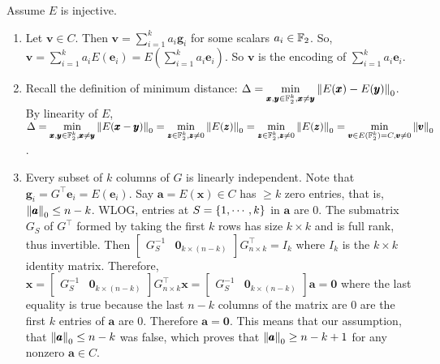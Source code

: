 \soln
Assume $E$ is injective.
\begin{enumerate}[leftmargin=*, label=(\alph*)]
\item Let $\pmb v\in C$. Then $\pmb v= \sum\limits_{i=1}^{k}a_{i}\pmb g_{i}$ for some scalars $a_{i}\in\mathbb{F}_{2}$. So, $\pmb v = \sum\limits_{i=1}^{k}a_{i}E(\pmb e_{i}) = E\left(\sum\limits_{i=1}^{k}a_{i}\pmb e_{i}\right)$. So $\pmb v$ is the encoding of $\sum\limits_{i=1}^{k}a_{i}\pmb e_{i}$.
\item Recall the definition of minimum distance: $\displaystyle\Delta = \min_{\pmb x,\pmb y\in \mathbb{F}_{2}^{k}, \pmb x\ne \pmb y} \left\lVert E(\pmb x)-E(\pmb y) \right\rVert_{0}$. By linearity of $E$, $\displaystyle\Delta = \min_{\pmb x,\pmb y\in \mathbb{F}_{2}^{k}, \pmb x\ne \pmb y} \left\lVert E(\pmb x-\pmb y) \right\rVert_{0} = \min_{\pmb z\in \mathbb{F}_{2}^{k}, \pmb z\ne 0} \left\lVert E(\pmb z) \right\rVert_{0} = \min_{\pmb z\in \mathbb{F}_{2}^{k}, \pmb z\ne 0} \left\lVert E(\pmb z) \right\rVert_{0} = \min_{\pmb v\in E(\mathbb{F}_{2}^{k})=C, \pmb v\ne 0} \left\lVert \pmb v \right\rVert_{0}$.
\item Every subset of $k$ columns of $G$ is linearly independent. Note that $\pmb g_{i} = G^{\top}\pmb e_{i} = E(\pmb e_{i})$. %
Say $\pmb a = E(\pmb x)\in C$ has $\ge k$ zero entries, that is, $\left\lVert \pmb a \right\rVert_{0} \le n-k$. WLOG, entries at $S=\left\{1,\cdots, k\right\}$ in $\pmb a$ are $0$. The submatrix $G_{S}$ of $G^{\top}$ formed by taking the first $k$ rows has size $k\times k$ and is full rank, thus invertible. Then $\begin{bmatrix}G_{S}^{-1} & \pmb 0_{k\times(n-k)}\end{bmatrix} G^{\top}_{n\times k} = I_{k}$ where $I_{k}$ is the $k\times k$ identity matrix. Therefore, $\pmb x = \begin{bmatrix}G_{S}^{-1} & \pmb 0_{k\times(n-k)}\end{bmatrix} G^{\top}_{n\times k} \pmb x = \begin{bmatrix}G_{S}^{-1} & \pmb 0_{k\times(n-k)}\end{bmatrix} \pmb a = \pmb 0$ where the last equality is true because the last $n-k$ columns of the matrix are $0$ are the first $k$ entries of $\pmb a$ are $0$. Therefore $\pmb a=\pmb 0$. This means that our assumption, that $\left\lVert \pmb a \right\rVert_{0} \le n-k$ was false, which proves that $\left\lVert \pmb a \right\rVert_{0} \ge n-k+1$ for any nonzero $\pmb a\in C$.
\end{enumerate}



